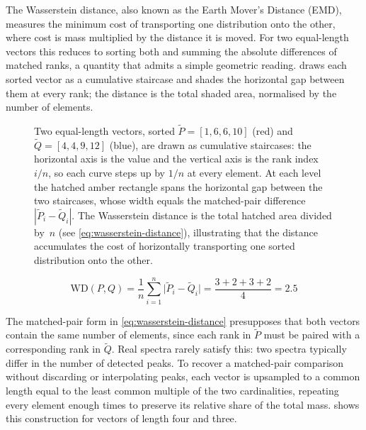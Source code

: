
The Wasserstein distance, also known as the Earth Mover's Distance (EMD), measures the minimum cost of transporting one distribution onto the other, where cost is mass multiplied by the distance it is moved.
For two equal-length vectors this reduces to sorting both and summing the absolute differences of matched ranks, a quantity that admits a simple geometric reading. 
 draws each sorted vector as a cumulative staircase and shades the horizontal gap between them at every rank; the distance is the total shaded area, normalised by the number of elements.

\begin{figure}[H]
    \centering
    \resizebox{\textwidth}{!}{
        
    }
    \caption[Wasserstein distance illustration]{
        Two equal-length vectors, sorted $\tilde P = [1,6,6,10]$ (red) and $\tilde Q = [4,4,9,12]$ (blue), are drawn as cumulative staircases: 
        the horizontal axis is the value and the vertical axis is the rank index $i/n$, so each curve steps up by $1/n$ at every element. 
        At each level the hatched amber rectangle spans the horizontal gap between the two staircases, whose width equals the matched-pair difference $|\tilde P_i - \tilde Q_i|$.
        The Wasserstein distance is the total hatched area divided by~$n$ (see \cref{eq:wasserstein-distance}),
        illustrating that the distance accumulates the cost of horizontally transporting one sorted distribution onto the other.
    }
    \label{fig:wasserstein-distance-illustration}
\end{figure}

\begin{equation}
    \label{eq:wasserstein-distance}
    \mathrm{WD}(P,Q)=\dfrac{1}{n}\sum_{i=1}^{n}\bigl|\tilde P_i-\tilde Q_i\bigr| =\dfrac{3+2+3+2}{4}=2.5
\end{equation}

The matched-pair form in \cref{eq:wasserstein-distance} presupposes that both vectors contain the same number of elements, since each rank in $\tilde P$ must be paired with a corresponding rank in $\tilde Q$. 
Real spectra rarely satisfy this: two spectra typically differ in the number of detected peaks. 
To recover a matched-pair comparison without discarding or interpolating peaks, each vector is upsampled to a common length equal to the least common multiple of the two cardinalities, repeating every element enough times to preserve its relative share of the total mass. 
 shows this construction for vectors of length four and three.

